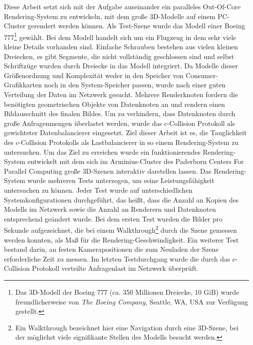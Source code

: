 Diese Arbeit setzt sich mit der Aufgabe auseinander ein paralleles Out-Of-Core Rendering-System zu entwickeln, mit dem große 3D-Modelle auf einem PC-Cluster gerendert werden können. Als Test-Szene wurde das Modell einer Boeing 777\footnote{Das 3D-Modell der Boeing 777 (ca. 350 Millionen Dreiecke, 10 GiB) wurde freundlicherweise von \textit{The Boeing Company}, Seattle, WA, USA zur Verfügung gestellt.} gewählt. Bei dem Modell handelt sich um ein Flugzeug in dem sehr viele kleine Details vorhanden sind. Einfache Schrauben bestehen aus vielen kleinen Dreiecken, es gibt Segmente, die nicht vollständig geschlossen sind und selbst Schriftzüge wurden durch Dreiecke in das Modell integriert. Da Modelle dieser Größenordnung und Komplexität weder in den Speicher von Consumer-Grafikkarten noch in den System-Speicher passen, wurde nach einer guten Verteilung der Daten im Netzwerk gesucht. Mehrere Renderknoten fordern die benötigten geometrischen Objekte von Datenknoten an und rendern einen Bildausschnitt des finalen Bildes. Um zu verhindern, dass Datenknoten durch große Anfragenmengen überlastet werden, wurde das $c$-Collision Protokoll als gewichteter Datenbalancierer eingesetzt. Ziel dieser Arbeit ist es, die Tauglichkeit des $c$-Collision Protokolls als Lastbalancierer in so einem Rendering-System zu untersuchen. Um das Ziel zu erreichen wurde ein funktionierendes Rendering-System entwickelt mit dem sich im Arminius-Cluster des Paderborn Centers For Parallel Computing große 3D-Szenen interaktiv darstellen lassen. Das Rendering-System wurde mehreren Tests unterzogen, um seine Leistungsfähigkeit untersuchen zu können. Jeder Test wurde auf unterschiedlichen Systemkonfigurationen durchgeführt, das heißt, dass die Anzahl an Kopien des Modells im Netzwerk sowie die Anzahl an Renderern und Datenknoten entsprechend geändert wurde. Bei dem ersten Test wurden die Bilder pro Sekunde aufgezeichnet, die bei einem Walkthrough\footnote{Ein Walkthrough bezeichnet hier eine Navigation durch eine 3D-Szene, bei der möglichst viele signifikante Stellen des Modells besucht werden.} durch die Szene gemessen werden konnten, als Maß für die Rendering-Geschwindigkeit. Ein weiterer Test bestand darin, an festen Kamerapositionen die zum Neuladen der Szene erforderliche Zeit zu messen. Im letzten Testdurchgang wurde die durch das $c$-Collision Protokoll verteilte Anfragenlast im Netzwerk überprüft.


%
%
